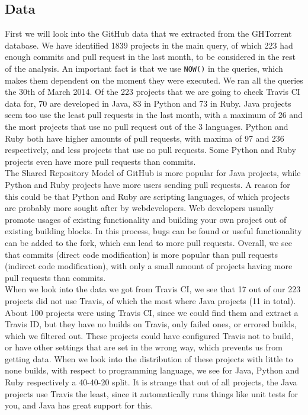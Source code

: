 \documentclass[a4paper,11pt]{article}
\begin{document}
		\subsection{Data}
			First we will look into the GitHub data that we extracted from the GHTorrent database. We have identified 1839 projects in the main query, of which 223 had enough commits and pull request in the last month, to be considered in the rest of the analysis. An important fact is that we use \texttt{NOW()} in the queries, which makes them dependent on the moment they were executed. We ran all the queries the 30th of March 2014. Of the 223 projects that we are going to check Travis CI data for, 70 are developed in Java, 83 in Python and 73 in Ruby. Java projects seem too use the least pull requests in the last month, with a maximum of 26 and the most projects that use no pull request out of the 3 languages. Python and Ruby both have higher amounts of pull requests, with maxima of 97 and 236 respectively, and less projects that use no pull requests. Some Python and Ruby projects even have more pull requests than commits. \\

			The Shared Repository Model of GitHub is more popular for Java projects, while Python and Ruby projects have more users sending pull requests. A reason for this could be that Python and Ruby are scripting languages, of which projects are probably more sought after by webdevelopers. Web developers usually promote usages of existing functionality and building your own project out of existing building blocks. In this process, bugs can be found or useful functionality can be added to the fork, which can lead to more pull requests. Overall, we see that commits (direct code modification) is more popular than pull requests (indirect code modification), with only a small amount of projects having more pull requests than commits. \\

			When we look into the data we got from Travis CI, we see that 17 out of our 223 projects did not use Travis, of which the most where Java projects (11 in total).  About 100 projects were using Travis CI, since we could find them and extract a Travis ID, but they have no builds on Travis, only failed ones, or errored builds, which we filtered out. These projects could have configured Travis not to build, or have other settings that are set in the wrong way, which prevents us from getting data. When we look into the distribution of these projects with little to none builds, with respect to programming language, we see for Java, Python and Ruby respectively a 40-40-20 split. It is strange that out of all projects, the Java projects use Travis the least, since it automatically runs things like unit tests for you, and Java has great support for this.\\
\end{document}

